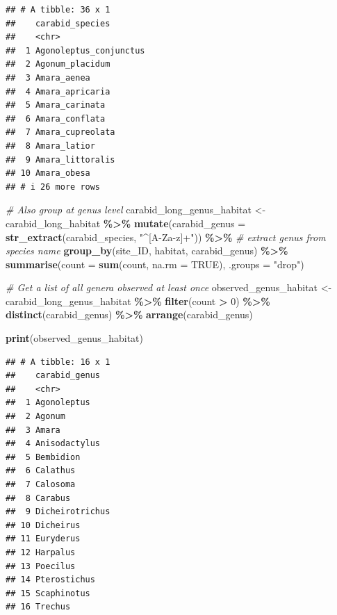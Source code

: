\documentclass[
]{article}
\newenvironment{Shaded}{\begin{snugshade}}{\end{snugshade}}
\newcommand{\AttributeTok}[1]{\textcolor[rgb]{0.13,0.29,0.53}{#1}}
\newcommand{\CommentTok}[1]{\textcolor[rgb]{0.56,0.35,0.01}{\textit{#1}}}
\newcommand{\ConstantTok}[1]{\textcolor[rgb]{0.56,0.35,0.01}{#1}}
\newcommand{\DecValTok}[1]{\textcolor[rgb]{0.00,0.00,0.81}{#1}}
\newcommand{\FunctionTok}[1]{\textcolor[rgb]{0.13,0.29,0.53}{\textbf{#1}}}
\newcommand{\NormalTok}[1]{#1}
\newcommand{\OtherTok}[1]{\textcolor[rgb]{0.56,0.35,0.01}{#1}}
\newcommand{\SpecialCharTok}[1]{\textcolor[rgb]{0.81,0.36,0.00}{\textbf{#1}}}
\newcommand{\StringTok}[1]{\textcolor[rgb]{0.31,0.60,0.02}{#1}}
\begin{document}
\begin{verbatim}
## # A tibble: 36 x 1
##    carabid_species       
##    <chr>                 
##  1 Agonoleptus_conjunctus
##  2 Agonum_placidum       
##  3 Amara_aenea           
##  4 Amara_apricaria       
##  5 Amara_carinata        
##  6 Amara_conflata        
##  7 Amara_cupreolata      
##  8 Amara_latior          
##  9 Amara_littoralis      
## 10 Amara_obesa           
## # i 26 more rows
\end{verbatim}

\begin{Shaded}
\begin{Highlighting}[]
\CommentTok{\# Also group at genus level}
\NormalTok{carabid\_long\_genus\_habitat }\OtherTok{\textless{}{-}}\NormalTok{ carabid\_long\_habitat }\SpecialCharTok{\%\textgreater{}\%}
  \FunctionTok{mutate}\NormalTok{(}\AttributeTok{carabid\_genus =} \FunctionTok{str\_extract}\NormalTok{(carabid\_species, }\StringTok{"\^{}[A{-}Za{-}z]+"}\NormalTok{)) }\SpecialCharTok{\%\textgreater{}\%}  \CommentTok{\# extract genus from species name}
  \FunctionTok{group\_by}\NormalTok{(site\_ID, habitat, carabid\_genus) }\SpecialCharTok{\%\textgreater{}\%}
  \FunctionTok{summarise}\NormalTok{(}\AttributeTok{count =} \FunctionTok{sum}\NormalTok{(count, }\AttributeTok{na.rm =} \ConstantTok{TRUE}\NormalTok{), }\AttributeTok{.groups =} \StringTok{"drop"}\NormalTok{)}

\CommentTok{\# Get a list of all genera observed at least once}
\NormalTok{observed\_genus\_habitat }\OtherTok{\textless{}{-}}\NormalTok{ carabid\_long\_genus\_habitat }\SpecialCharTok{\%\textgreater{}\%}
  \FunctionTok{filter}\NormalTok{(count }\SpecialCharTok{\textgreater{}} \DecValTok{0}\NormalTok{) }\SpecialCharTok{\%\textgreater{}\%} 
  \FunctionTok{distinct}\NormalTok{(carabid\_genus) }\SpecialCharTok{\%\textgreater{}\%}
  \FunctionTok{arrange}\NormalTok{(carabid\_genus)}


\FunctionTok{print}\NormalTok{(observed\_genus\_habitat)}
\end{Highlighting}
\end{Shaded}

\begin{verbatim}
## # A tibble: 16 x 1
##    carabid_genus  
##    <chr>          
##  1 Agonoleptus    
##  2 Agonum         
##  3 Amara          
##  4 Anisodactylus  
##  5 Bembidion      
##  6 Calathus       
##  7 Calosoma       
##  8 Carabus        
##  9 Dicheirotrichus
## 10 Dicheirus      
## 11 Euryderus      
## 12 Harpalus       
## 13 Poecilus       
## 14 Pterostichus   
## 15 Scaphinotus    
## 16 Trechus
\end{verbatim}
\end{document}
